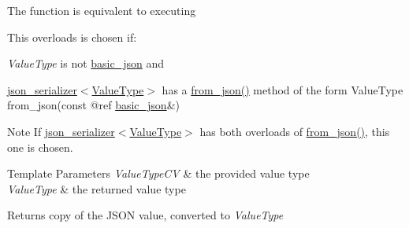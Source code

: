 The function is equivalent to executing 
\begin{DoxyCode}{0}
\end{DoxyCode}


This overloads is chosen if\+:
\begin{DoxyItemize}
\item {\itshape Value\+Type} is not \mbox{\hyperlink{classnlohmann_1_1basic__json}{basic\+\_\+json}} and
\item \mbox{\hyperlink{classnlohmann_1_1basic__json_a7768841baaaa7a21098a401c932efaff}{json\+\_\+serializer$<$\+Value\+Type$>$}} has a {\ttfamily \mbox{\hyperlink{namespacenlohmann_1_1detail_a839b0ab50d2c9bce669068f56bc41202}{from\+\_\+json()}}} method of the form {\ttfamily Value\+Type from\+\_\+json(const @ref \mbox{\hyperlink{classnlohmann_1_1basic__json}{basic\+\_\+json}}\&)}
\end{DoxyItemize}

\begin{DoxyNote}{Note}
If \mbox{\hyperlink{classnlohmann_1_1basic__json_a7768841baaaa7a21098a401c932efaff}{json\+\_\+serializer$<$\+Value\+Type$>$}} has both overloads of {\ttfamily \mbox{\hyperlink{namespacenlohmann_1_1detail_a839b0ab50d2c9bce669068f56bc41202}{from\+\_\+json()}}}, this one is chosen.
\end{DoxyNote}

\begin{DoxyTemplParams}{Template Parameters}
{\em Value\+Type\+CV} & the provided value type \\
\hline
{\em Value\+Type} & the returned value type\\
\hline
\end{DoxyTemplParams}
\begin{DoxyReturn}{Returns}
copy of the J\+S\+ON value, converted to {\itshape Value\+Type} 
\end{DoxyReturn}

